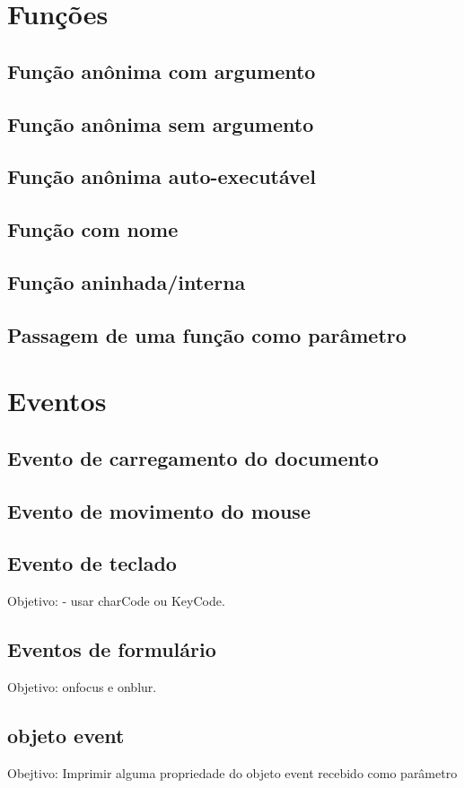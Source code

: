 \section{Funções}
\subsection{Função anônima com argumento}
\subsection{Função anônima sem argumento}
\subsection{Função anônima auto-executável}
\subsection{Função com nome}
\subsection{Função aninhada/interna}
\subsection{Passagem de uma função como parâmetro}

\section{Eventos}
\subsection{Evento de carregamento do documento}
\subsection{Evento de movimento do mouse}
\subsection{Evento de teclado}
 Objetivo:  - usar charCode ou KeyCode.
\subsection{Eventos de formulário}
Objetivo: onfocus e onblur.
\subsection{objeto event}
Obejtivo: Imprimir alguma propriedade do objeto event recebido como parâmetro

